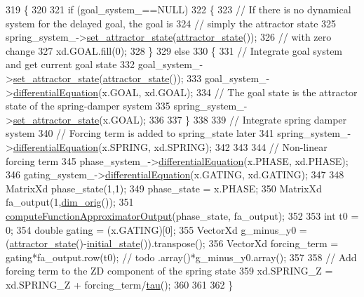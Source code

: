 \begin{DoxyCode}
319 \{
320   
321   \textcolor{keywordflow}{if} (goal\_system\_==NULL)
322   \{
323     \textcolor{comment}{// If there is no dynamical system for the delayed goal, the goal is}
324     \textcolor{comment}{// simply the attractor state}
325     spring\_system\_->\hyperlink{group__DynamicalSystems_ga32a975e60b5f001308368c7f06b90e18}{set\_attractor\_state}(\hyperlink{group__DynamicalSystems_gaebe3c462bc4a725cb17bcc3d13285f13}{attractor\_state}());
326     \textcolor{comment}{// with zero change}
327     xd.GOAL.fill(0);
328   \} 
329   \textcolor{keywordflow}{else}
330   \{
331     \textcolor{comment}{// Integrate goal system and get current goal state}
332     goal\_system\_->\hyperlink{group__DynamicalSystems_ga32a975e60b5f001308368c7f06b90e18}{set\_attractor\_state}(\hyperlink{group__DynamicalSystems_gaebe3c462bc4a725cb17bcc3d13285f13}{attractor\_state}());
333     goal\_system\_->\hyperlink{classDmpBbo_1_1DynamicalSystem_a70acc98a8e024f9b6e0e6de1b519e260}{differentialEquation}(x.GOAL, xd.GOAL);
334     \textcolor{comment}{// The goal state is the attractor state of the spring-damper system}
335     spring\_system\_->\hyperlink{group__DynamicalSystems_ga32a975e60b5f001308368c7f06b90e18}{set\_attractor\_state}(x.GOAL);
336         
337   \}
338 
339   \textcolor{comment}{// Integrate spring damper system}
340   \textcolor{comment}{// Forcing term is added to spring\_state later}
341   spring\_system\_->\hyperlink{classDmpBbo_1_1SpringDamperSystem_ab564468764e7e4dc7c11e2a786e22c19}{differentialEquation}(x.SPRING, xd.SPRING);
342 
343   
344   \textcolor{comment}{// Non-linear forcing term}
345   phase\_system\_->\hyperlink{classDmpBbo_1_1DynamicalSystem_a70acc98a8e024f9b6e0e6de1b519e260}{differentialEquation}(x.PHASE, xd.PHASE);
346   gating\_system\_->\hyperlink{classDmpBbo_1_1DynamicalSystem_a70acc98a8e024f9b6e0e6de1b519e260}{differentialEquation}(x.GATING, xd.GATING);
347 
348   MatrixXd phase\_state(1,1);
349   phase\_state = x.PHASE;
350   MatrixXd fa\_output(1,\hyperlink{group__DynamicalSystems_ga93d7cbbf2e471b00f124e41706405a05}{dim\_orig}());
351   \hyperlink{classDmpBbo_1_1Dmp_a89078b732a4579130e24e3bc59c1713c}{computeFunctionApproximatorOutput}(phase\_state, fa\_output); 
352   
353   \textcolor{keywordtype}{int} t0 = 0;
354   \textcolor{keywordtype}{double} gating = (x.GATING)[0];
355   VectorXd g\_minus\_y0 = (\hyperlink{group__DynamicalSystems_gaebe3c462bc4a725cb17bcc3d13285f13}{attractor\_state}()-\hyperlink{group__DynamicalSystems_ga4c7f24e7deec1629548a075015bdc693}{initial\_state}()).transpose();
356   VectorXd forcing\_term = gating*fa\_output.row(t0); \textcolor{comment}{// todo .array()*g\_minus\_y0.array();}
357 
358   \textcolor{comment}{// Add forcing term to the ZD component of the spring state}
359   xd.SPRING\_Z = xd.SPRING\_Z + forcing\_term/\hyperlink{group__DynamicalSystems_ga50eec7ad4c9664b5809ace45b22200d5}{tau}();
360 
361 
362 \}
\end{DoxyCode}


